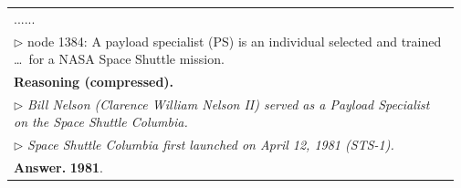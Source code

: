 \begin{table}[H]
\begin{tabular}{p{0.97\linewidth}}
......\\
\(\triangleright\) node 1384:
A payload specialist (PS) is an individual selected and trained \ldots\ for a NASA Space Shuttle mission.\\
\midrule
\textbf{Reasoning (compressed).}\\
\(\triangleright\) \emph{Bill Nelson (Clarence William Nelson II) served as a Payload Specialist on the Space Shuttle Columbia.}\\
\(\triangleright\) \emph{Space Shuttle Columbia first launched on April 12, 1981 (STS-1).}\\
\midrule
\textbf{Answer.} \textbf{1981}.\\
\bottomrule
\end{tabular}

\end{table}